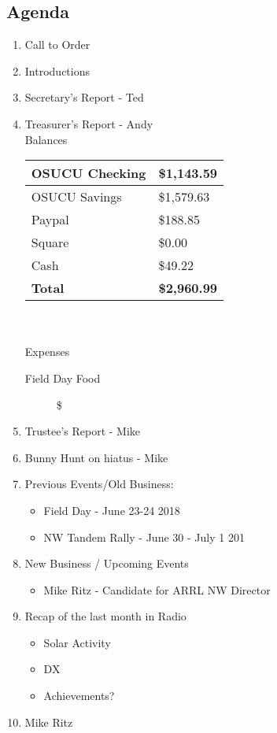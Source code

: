 \documentclass[letter,11pt]{extarticle}
\begin{document}
	\subsection*{Agenda}
	\begin{enumerate}
		\item Call to Order
		\item Introductions
		\item Secretary's Report - Ted
		\item Treasurer's Report - Andy \\
				Balances 
			\begin{tabular}{|l|l|} \hline
				OSUCU Checking & \$1,143.59 \\ \hline
				OSUCU Savings & \$1,579.63 \\ \hline
				Paypal & \$188.85 \\ \hline
				Square & \$0.00 \\ \hline
				Cash & \$49.22 \\ \hline
				\textbf{Total} & \textbf{\$2,960.99} \\ \hline
			\end{tabular} \\ \\
			Expenses
			\begin{description}
				\item[Field Day Food] \$
			\end{description}
		\item Trustee's Report - Mike
		\item Bunny Hunt on hiatus - Mike
		\item Previous Events/Old Business:
		\begin{itemize}
			\item Field Day - June 23-24 2018
			\item NW Tandem Rally - June 30 - July 1 201
		\end{itemize}
				
		\item  New Business / Upcoming Events
			\begin{itemize}
				\item Mike Ritz - Candidate for ARRL NW Director
			\end{itemize}
		\item Recap of the last month in Radio
			\begin{itemize}
				\item Solar Activity
				\item DX
				\item Achievements?
			\end{itemize}
		\item  Mike Ritz
	\end{enumerate}
\end{document}
